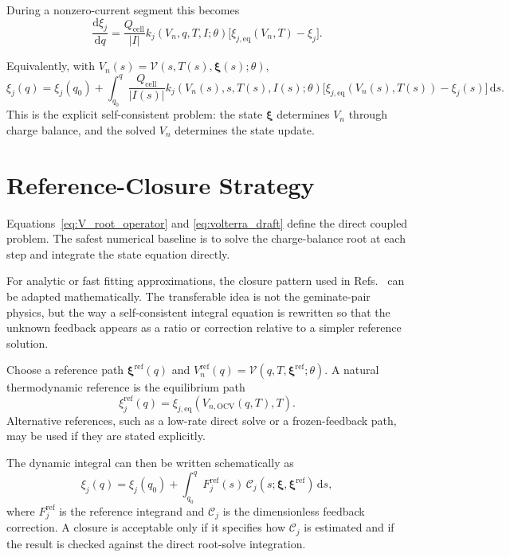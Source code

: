 \documentclass[11pt,a4paper]{article}
\newcommand{\dd}{\mathrm{d}}
\newcommand{\OCV}{\mathrm{OCV}}
\newcommand{\cell}{\mathrm{cell}}
\newcommand{\eq}{\mathrm{eq}}
\newcommand{\refe}{\mathrm{ref}}
\begin{document}
During a nonzero-current segment this becomes
\begin{equation}
\frac{\dd \xi_j}{\dd q}
=
\frac{Q_{\cell}}{|I|}
k_j(V_n,q,T,I;\theta)
\bigl[\xi_{j,\eq}(V_n,T)-\xi_j\bigr].
\label{eq:dxidq_draft}
\end{equation}

Equivalently, with \(V_n(s)=\mathcal V(s,T(s),\bm{\xi}(s);\theta)\),
\begin{equation}
\xi_j(q)
=
\xi_j(q_0)
+
\int_{q_0}^{q}
\frac{Q_{\cell}}{|I(s)|}
k_j(V_n(s),s,T(s),I(s);\theta)
\bigl[\xi_{j,\eq}(V_n(s),T(s))-\xi_j(s)\bigr]
\,\dd s .
\label{eq:volterra_draft}
\end{equation}
This is the explicit self-consistent problem: the state \(\bm{\xi}\) determines
\(V_n\) through charge balance, and the solved \(V_n\) determines the state
update.

\section{Reference-Closure Strategy}

Equations~\eqref{eq:V_root_operator} and \eqref{eq:volterra_draft} define the
direct coupled problem.  The safest numerical baseline is to solve the
charge-balance root at each step and integrate the state equation directly.

For analytic or fast fitting approximations, the closure pattern used in
Refs.~\cite{Lee2011Propagator,Son2013Rates} can be adapted mathematically.
The transferable idea is not the geminate-pair physics, but the way a
self-consistent integral equation is rewritten so that the unknown feedback
appears as a ratio or correction relative to a simpler reference solution.

Choose a reference path \(\bm{\xi}^{\refe}(q)\) and
\(V_n^{\refe}(q)=\mathcal V(q,T,\bm{\xi}^{\refe};\theta)\).  A natural
thermodynamic reference is the equilibrium path
\begin{equation}
\xi_j^{\refe}(q)
=
\xi_{j,\eq}\!\left(V_{n,\OCV}(q,T),T\right).
\label{eq:eq_reference_path}
\end{equation}
Alternative references, such as a low-rate direct solve or a frozen-feedback
path, may be used if they are stated explicitly.

The dynamic integral can then be written schematically as
\begin{equation}
\xi_j(q)=\xi_j(q_0)+
\int_{q_0}^{q}
F_j^{\refe}(s)\,
\mathcal C_j(s;\bm{\xi},\bm{\xi}^{\refe})\,\dd s,
\label{eq:closure_schematic}
\end{equation}
where \(F_j^{\refe}\) is the reference integrand and
\(\mathcal C_j\) is the dimensionless feedback correction.  A closure is
acceptable only if it specifies how \(\mathcal C_j\) is estimated and if the
result is checked against the direct root-solve integration.
\end{document}
